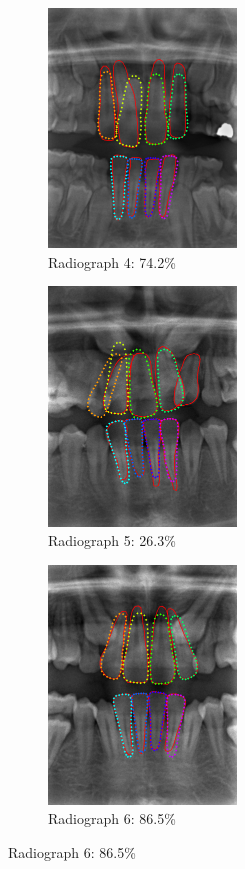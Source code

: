 \documentclass[a4paper,10pt]{article}
\begin{document}
\begin{figure}
\begin{subfigure}{.33\textwidth}
\centering
\includegraphics[width=50mm]{tooth_result_overlay_4.png}
\caption{Radiograph 4: 74.2\%}
\end{subfigure}%
\begin{subfigure}{.33\textwidth}
\centering
\includegraphics[width=50mm]{tooth_result_overlay_5.png}
\caption{Radiograph 5: 26.3\%}
\end{subfigure}%
\begin{subfigure}{.33\textwidth}
\centering
\includegraphics[width=50mm]{tooth_result_overlay_6.png}
\caption{Radiograph 6: 86.5\%}
\end{subfigure}%


\end{figure}
\end{document}
